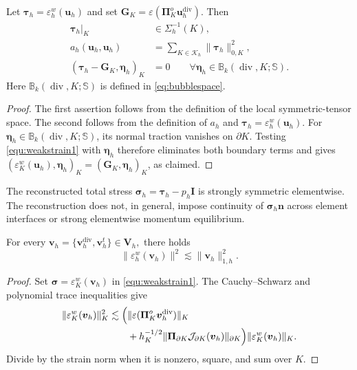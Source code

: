 \documentclass[review,hidelinks,onefignum,onetabnum]{siamart251216}
\renewcommand{\div}{\operatorname{div}}
\begin{document}
\begin{proposition}
\label{prop:stress-properties}
Let $\boldsymbol\tau_h=\varepsilon_h^w(\boldsymbol u_h)$ and set
$\boldsymbol G_K=\varepsilon(\boldsymbol\Pi_K^o
\boldsymbol u_h^{\operatorname{div}})$. Then
\begin{equation}\label{eq:stress-properties}
\begin{aligned}
\boldsymbol\tau_h|_K&\in\Sigma_h^{-1}(K),\\
a_h(\boldsymbol u_h,\boldsymbol u_h)
 &=\sum_{K\in\mathcal K_h}\|\boldsymbol\tau_h\|_{0,K}^2,\\
(\boldsymbol\tau_h-\boldsymbol G_K,\boldsymbol\eta_h)_K
 &=0\qquad\forall\boldsymbol\eta_h\in \mathbb B_k(\div,K;\mathbb S).
\end{aligned}
\end{equation}
Here $\mathbb B_k(\div,K;\mathbb S)$ is defined in \eqref{eq:bubblespace}.
\end{proposition}
\begin{proof}
The first assertion follows from the definition of the local
symmetric-tensor space. The second follows from the definition of
$a_h$ and $\boldsymbol\tau_h=\varepsilon_h^w(\boldsymbol u_h)$.
For $\boldsymbol\eta_h\in \mathbb B_k(\div,K;\mathbb S)$, its normal traction vanishes on
$\partial K$. Testing \eqref{equ:weakstrain1} with
$\boldsymbol\eta_h$ therefore eliminates both boundary terms and gives
$(\varepsilon_K^w(\boldsymbol u_h),\boldsymbol\eta_h)_K
=(\boldsymbol G_K,\boldsymbol\eta_h)_K$, as claimed.
\end{proof}
The reconstructed total stress
$\boldsymbol\sigma_h=\boldsymbol\tau_h-p_h\boldsymbol I$ is
strongly symmetric elementwise. The reconstruction does not, in
general, impose continuity of $\boldsymbol\sigma_h\boldsymbol n$
across element interfaces or strong elementwise momentum equilibrium.

\begin{lemma}
For every
\(
\boldsymbol{v}_h=\{\boldsymbol{v}_h^{\operatorname{div}},\boldsymbol{v}_h^t\}\in \boldsymbol{V}_h,
\)
there holds
\[
\|\varepsilon_h^w(\boldsymbol{v}_h)\|^2
\lesssim
\|\boldsymbol{v}_h\|_{1,h}^2.
\]
\end{lemma}

\begin{proof}
Set $\boldsymbol\sigma=\varepsilon_K^w(\boldsymbol v_h)$ in
\eqref{equ:weakstrain1}. The Cauchy--Schwarz and polynomial trace inequalities give
\[
\begin{aligned}
\|\varepsilon_K^w(\boldsymbol v_h)\|_K^2
\lesssim\Bigl(&\|\varepsilon(\boldsymbol\Pi_K^o\boldsymbol v_h^{\operatorname{div}})\|_K\\
&+h_K^{-1/2}\|\boldsymbol\Pi_{\partial K}\mathcal J_{\partial K}(\boldsymbol v_h)\|_{\partial K}\Bigr)
\|\varepsilon_K^w(\boldsymbol v_h)\|_K.
\end{aligned}
\]
Divide by the strain norm when it is nonzero, square, and sum over $K$.
\end{proof}
\end{document}
